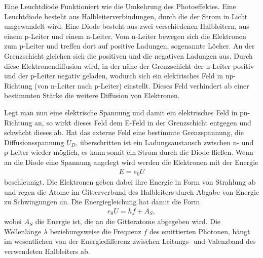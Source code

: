 Eine Leuchtdiode Funktioniert wie die Umkehrung des Photoeffektes. Eine Leuchtdiode besteht aus Halbleiterverbindungen,
 durch die der Strom in Licht umgewandelt wird.
Eine Diode besteht aus zwei verschiedenen Halbleitern, aus einem p-Leiter und einem n-Leiter. Vom n-Leiter bewegen sich
die Elektronen zum p-Leiter und treffen dort auf positive Ladungen, sogenannte Löcher. An der Grenzschicht gleichen 
sich die positiven und die negativen Ladungen aus. Durch diese Elektronendiffusion wird, in der nähe der Grenzschicht 
der n-Leiter positiv und der p-Leiter negativ geladen, wodurch sich ein elektrisches Feld in np-Richtung (von n-Leiter 
nach p-Leiter) einstellt. Dieses Feld verhindert ab einer bestimmten Stärke die weitere Diffusion von Elektronen.

Legt man nun eine elektrische Spannung und damit ein elektrisches Feld in pn-Richtung an, so wirkt dieses Feld 
dem E-Feld in der Grenzschicht entgegen und schwächt dieses ab. Hat das externe Feld eine bestimmte Grenzspannung,
die Diffusionsspannung $U_{D}$, überschritten ist ein Ladungsaustausch zwischen n- und p-Leiter wieder möglich,
es kann somit ein Strom durch die Diode fließen.  
Wenn an die Diode eine Spannung angelegt wird werden die Elektronen mit der Energie
\begin{align}
E=e_0U
\end{align}
beschleunigt. Die Elektronen geben dabei ihre Energie in Form von Strahlung ab und regen die Atome im 
Gitterverbund des Halbleiters durch Abgabe von Energie zu Schwingungen an.
Die Energiegleichung hat damit die Form
\begin{align}
e_0U=hf+A_S,
\end{align}
wobei $A_S$ die Energie ist, die an die Gitteratome abgegeben wird.
Die Wellenlänge $\lambda$ beziehungsweise die Frequenz $f$ des emittierten Photonen, hängt im wesentlichen von
der Energiedifferenz zwischen Leitungs- und Valenzband des verwendeten Halbleiters ab.\\ 



